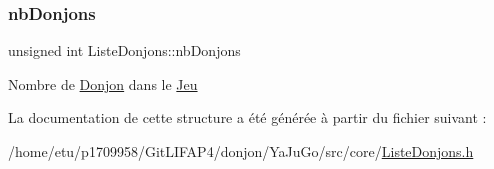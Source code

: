 \subsubsection{\texorpdfstring{nb\+Donjons}{nbDonjons}}
{\footnotesize\ttfamily unsigned int Liste\+Donjons\+::nb\+Donjons}

Nombre de \mbox{\hyperlink{classDonjon}{Donjon}} dans le \mbox{\hyperlink{classJeu}{Jeu}} 

La documentation de cette structure a été générée à partir du fichier suivant \+:\begin{DoxyCompactItemize}
\item 
/home/etu/p1709958/\+Git\+L\+I\+F\+A\+P4/donjon/\+Ya\+Ju\+Go/src/core/\mbox{\hyperlink{ListeDonjons_8h}{Liste\+Donjons.\+h}}\end{DoxyCompactItemize}
